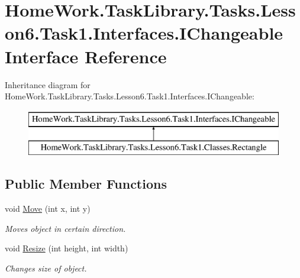 \hypertarget{interface_home_work_1_1_task_library_1_1_tasks_1_1_lesson6_1_1_task1_1_1_interfaces_1_1_i_changeable}{}\section{Home\+Work.\+Task\+Library.\+Tasks.\+Lesson6.\+Task1.\+Interfaces.\+I\+Changeable Interface Reference}
\label{interface_home_work_1_1_task_library_1_1_tasks_1_1_lesson6_1_1_task1_1_1_interfaces_1_1_i_changeable}
Inheritance diagram for Home\+Work.\+Task\+Library.\+Tasks.\+Lesson6.\+Task1.\+Interfaces.\+I\+Changeable\+:\begin{figure}[H]
\begin{center}
\leavevmode
\includegraphics[height=2.000000cm]{interface_home_work_1_1_task_library_1_1_tasks_1_1_lesson6_1_1_task1_1_1_interfaces_1_1_i_changeable}
\end{center}
\end{figure}
\subsection*{Public Member Functions}
\begin{DoxyCompactItemize}
\item 
void \mbox{\hyperlink{interface_home_work_1_1_task_library_1_1_tasks_1_1_lesson6_1_1_task1_1_1_interfaces_1_1_i_changeable_a7a582bc0f96f4617d8a1667da950e389}{Move}} (int x, int y)
\begin{DoxyCompactList}\small\item\em Moves object in certain direction. \end{DoxyCompactList}\item 
void \mbox{\hyperlink{interface_home_work_1_1_task_library_1_1_tasks_1_1_lesson6_1_1_task1_1_1_interfaces_1_1_i_changeable_a706c404159fa36fe0a80cdb9f4fa3812}{Resize}} (int height, int width)
\begin{DoxyCompactList}\small\item\em Changes size of object. \end{DoxyCompactList}\end{DoxyCompactItemize}


